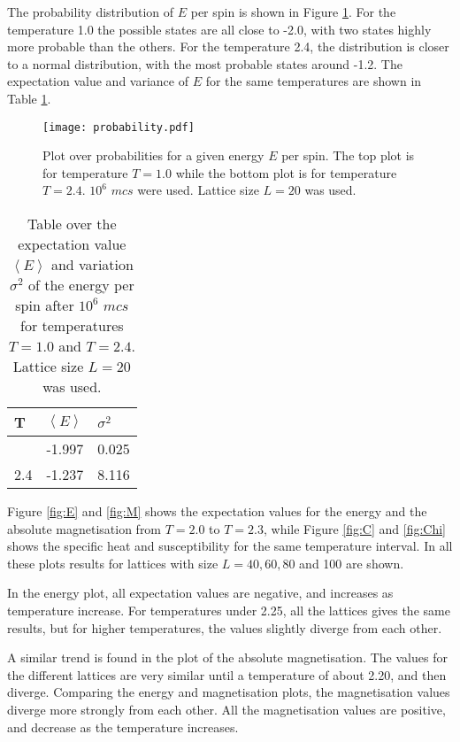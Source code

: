 The probability distribution of $E$ per spin is shown in Figure \ref{fig:prob}. For the temperature 1.0 the possible states are all close to -2.0, with two states highly more probable than the others. For the temperature 2.4, the distribution is closer to a normal distribution, with the most probable states around -1.2. The expectation value and variance of $E$ for the same temperatures are shown in Table \ref{tab:prob}.
\begin{figure}[htbp]
	\centering
	\texttt{[image: probability.pdf]}
	\caption{Plot over probabilities for a given energy $E$ per spin. The top plot is for temperature $T = 1.0$ while the bottom plot is for temperature $T=2.4$. $10^6$ $mcs$ were used. Lattice size $L=20$ was used.}
	\label{fig:prob}
\end{figure}
\begin{table}[htbp]
	\centering
	\begin{tabular}{lll}
		T   & $\left\langle E\right\rangle$  & $\sigma^2$ \\
		\hline
		\addlinespace[0.1cm]
		1.0   & -1.997 & 0.025 \\
		2.4 & -1.237  & 8.116
	\end{tabular}
	\caption{Table over the expectation value  $\left\langle E\right\rangle$ and variation  $\sigma^2$ of the energy per spin after $10^6$ $mcs$ for temperatures $T=1.0$ and $T=2.4$. Lattice size $L=20$ was used.}
	\label{tab:prob}
\end{table}

Figure \ref{fig:E} and \ref{fig:M} shows the expectation values for the energy and the absolute magnetisation from $T=2.0$ to $T=2.3$, while Figure \ref{fig:C} and \ref{fig:Chi} shows the specific heat and susceptibility for the same temperature interval. In all these plots results for lattices with size $L=40,60,80$ and 100 are shown. 

In the energy plot, all expectation values are negative, and increases as temperature increase. For temperatures under 2.25, all the lattices gives the same results, but for higher temperatures, the values slightly diverge from each other.
 
A similar trend is found in the plot of the absolute magnetisation. The values for the different lattices are very similar until a temperature of about 2.20, and then diverge. Comparing the energy and magnetisation plots, the magnetisation values diverge more strongly from each other. All the magnetisation values are positive, and decrease as the temperature increases.   


